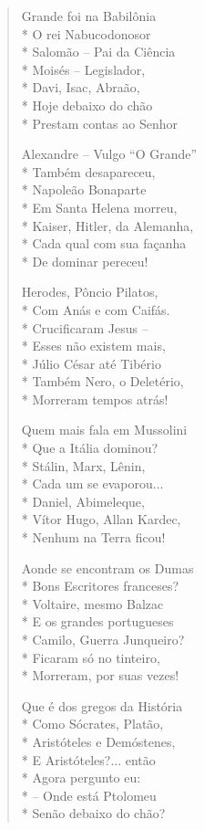 \begin{verse}
Grande foi na Babilônia\\*
O rei Nabucodonosor\\*
Salomão --  Pai da Ciência\\*
Moisés --  Legislador,\\*
Davi, Isac, Abraão,\\*
Hoje debaixo do chão\\*
Prestam contas ao Senhor

Alexandre --  Vulgo ``O Grande''\\*
Também desapareceu,\\*
Napoleão Bonaparte\\*
Em Santa Helena morreu,\\*
Kaiser, Hitler, da Alemanha,\\*
Cada qual com sua façanha\\*
De dominar pereceu!

Herodes, Pôncio Pilatos,\\*
Com Anás e com Caifás.\\*
Crucificaram Jesus --\\*
Esses não existem mais,\\*
Júlio César até Tibério\\*
Também Nero, o Deletério,\\*
Morreram tempos atrás!

Quem mais fala em Mussolini\\*
Que a Itália dominou?\\*
Stálin, Marx, Lênin,\\*
Cada um se evaporou...\\*
Daniel, Abimeleque,\\*
Vítor Hugo, Allan Kardec,\\*
Nenhum na Terra ficou!

Aonde se encontram os Dumas\\*
Bons Escritores franceses?\\*
Voltaire, mesmo Balzac\\*
E os grandes portugueses\\*
Camilo, Guerra Junqueiro?\\*
Ficaram só no tinteiro,\\*
Morreram, por suas vezes!

Que é dos gregos da História\\*
Como Sócrates, Platão,\\*
Aristóteles e Demóstenes,\\*
E Aristóteles?... então\\*
Agora pergunto eu:\\*
--  Onde está Ptolomeu\\*
Senão debaixo do chão?


\end{verse}
